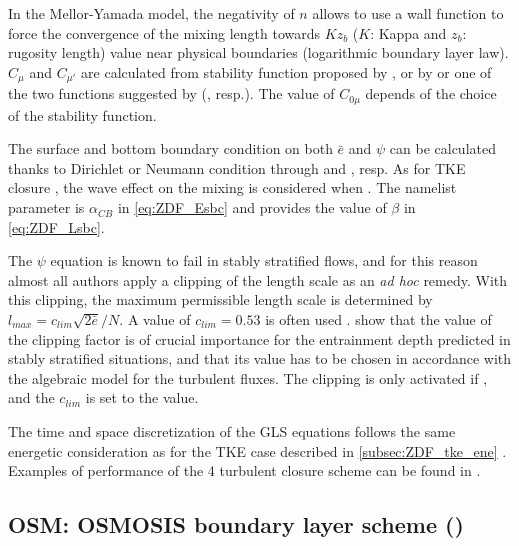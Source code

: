 \documentclass[../tex_main/NEMO_manual]{subfiles}
\begin{document}
In the Mellor-Yamada model, the negativity of $n$ allows to use a wall function to force
the convergence of the mixing length towards $K z_b$ ($K$: Kappa and $z_b$: rugosity length) 
value near physical boundaries (logarithmic boundary layer law). $C_{\mu}$ and $C_{\mu'}$ 
are calculated from stability function proposed by \citet{Galperin_al_JAS88}, or by \citet{Kantha_Clayson_1994} 
or one of the two functions suggested by \citet{Canuto_2001}  (, resp.). 
The value of $C_{0\mu}$ depends of the choice of the stability function.

The surface and bottom boundary condition on both $\bar{e}$ and $\psi$ can be calculated 
thanks to Dirichlet or Neumann condition through  and , resp. 
As for TKE closure , the wave effect on the mixing is considered when 
\citep{Craig_Banner_JPO94, Mellor_Blumberg_JPO04}. The  namelist parameter 
is $\alpha_{CB}$ in \autoref{eq:ZDF_Esbc} and  provides the value of $\beta$ in \autoref{eq:ZDF_Lsbc}. 

The $\psi$ equation is known to fail in stably stratified flows, and for this reason 
almost all authors apply a clipping of the length scale as an \textit{ad hoc} remedy. 
With this clipping, the maximum permissible length scale is determined by 
$l_{max} = c_{lim} \sqrt{2\bar{e}}/ N$. A value of $c_{lim} = 0.53$ is often used 
\citep{Galperin_al_JAS88}. \cite{Umlauf_Burchard_CSR05} show that the value of 
the clipping factor is of crucial importance for the entrainment depth predicted in 
stably stratified situations, and that its value has to be chosen in accordance 
with the algebraic model for the turbulent fluxes. The clipping is only activated 
if , and the $c_{lim}$ is set to the  value.

The time and space discretization of the GLS equations follows the same energetic 
consideration as for the TKE case described in \autoref{subsec:ZDF_tke_ene}  \citep{Burchard_OM02}. 
Examples of performance of the 4 turbulent closure scheme can be found in \citet{Warner_al_OM05}.

\subsection{OSM: OSMOSIS boundary layer scheme (\protect{})}
\label{subsec:ZDF_osm}
\end{document}
